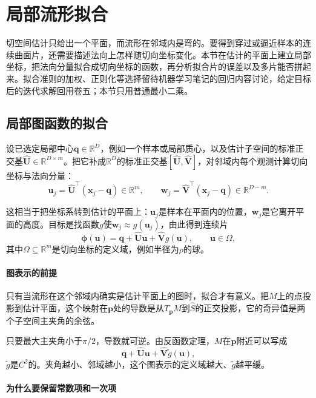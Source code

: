 \section{局部流形拟合}
\label{sec:mrec-local-fit}

切空间估计只给出一个平面，而流形在邻域内是弯的。要得到穿过或逼近样本的连续曲面片，还需要描述法向上怎样随切向坐标变化。本节在估计的平面上建立局部坐标，把法向分量拟合成切向坐标的函数，再分析拟合片的误差以及多片能否拼起来。拟合准则的加权、正则化等选择留待机器学习笔记的回归内容讨论，给定目标后的迭代求解回用卷五；本节只用普通最小二乘。

\subsection{局部图函数的拟合}
\label{sec:mrec-graph-fit}

设已选定局部中心$\bm q\in\mathbb R^D$，例如一个样本或局部质心，以及估计子空间的标准正交基$\widehat{\bm U}\in\mathbb R^{D\times m}$。把它补成$\mathbb R^D$的标准正交基$[\widehat{\bm U},\widehat{\bm V}]$，对邻域内每个观测计算切向坐标与法向分量：
\[
 \bm u_j=\widehat{\bm U}^\top(\bm x_j-\bm q)\in\mathbb R^m,\qquad
 \bm w_j=\widehat{\bm V}^\top(\bm x_j-\bm q)\in\mathbb R^{D-m}.
\]

这相当于把坐标系转到估计的平面上：$\bm u_j$是样本在平面内的位置，$\bm w_j$是它离开平面的高度。目标是找函数$g$使$\bm w_j\approx g(\bm u_j)$，由此得到连续片
\begin{equation}
 \bm\phi(\bm u)=\bm q+\widehat{\bm U}\bm u+\widehat{\bm V}g(\bm u),\qquad\bm u\in\Omega ,
 \label{eq:mrec-patch}
\end{equation}
其中$\Omega\subseteq\mathbb R^m$是切向坐标的定义域，例如半径为$\rho$的球。

\paragraph{图表示的前提}

只有当流形在这个邻域内确实是估计平面上的图时，拟合才有意义。把$M$上的点投影到估计平面，这个映射在$\bm p$处的导数是从$T_{\bm p}M$到$\widehat S$的正交投影，它的奇异值是两个子空间主夹角的余弦。

只要最大主夹角小于$\pi/2$，导数就可逆。由反函数定理，$M$在$\bm p$附近可以写成
\[
 \bm q+\widehat{\bm U}\bm u+\widehat{\bm V}\widetilde g(\bm u),
\]
$\widetilde g$是$C^2$的。夹角越小、邻域越小，这个图表示的定义域越大、$\widetilde g$越平缓。

\paragraph{为什么要保留常数项和一次项}

